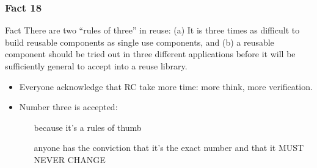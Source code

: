 \documentclass{beamer}
\begin{document}
\begin{frame}
    \frametitle{Fact 18}
    \begin{block}{Fact}
    There are two \enquote{rules of three} in reuse: (a) It is three times as
    difficult to build reusable components as single use components, and (b) a
    reusable component should be tried out in three different applications
    before it will be sufficiently general to accept into a reuse library.
    \end{block}


    \begin{itemize}

        \item Everyone acknowledge that RC take more time: more think,
            more verification.

        \item Number three is accepted:
            \begin{itemize}
                \item[\alert{because}] it's a rules of thumb
            \item[\alert{anyone}] has the conviction that it's the exact number and
            that it MUST NEVER CHANGE
            \end{itemize}
    \end{itemize}
\end{frame}
\end{document}
